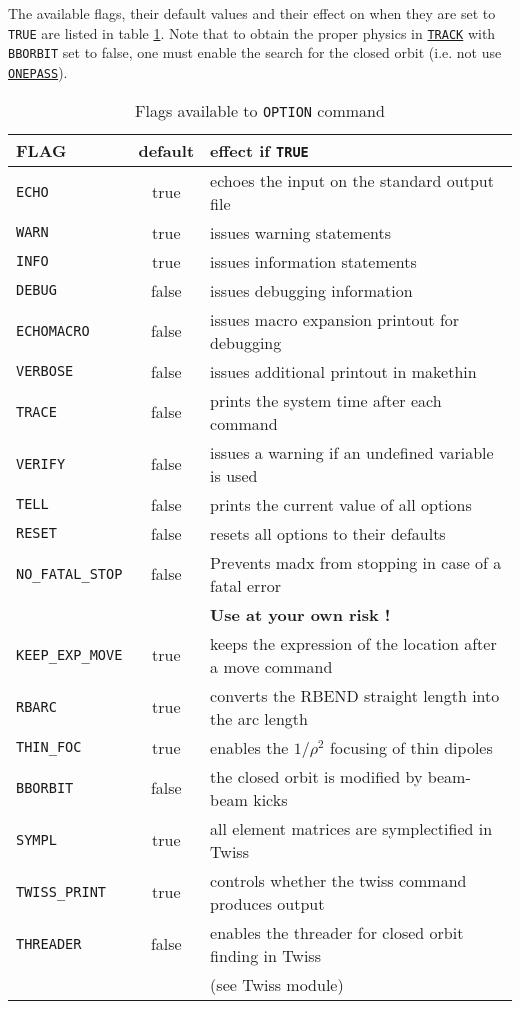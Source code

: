 The available flags, their default values and their effect on \madx when
they are set to \texttt{TRUE} are listed in table \ref{table:options}. Note that to obtain the proper physics in \hyperref[sec:track]{\texttt{TRACK}} with \texttt{BBORBIT} set to false, one must enable the search for the closed orbit (i.e. not use \hyperref[sec:track]{\texttt{ONEPASS}}).

\begin{table}[ht]
  \caption{Flags available to \texttt{OPTION} command}
  \vspace{1ex}
  \centering
  \label{table:options}
  \begin{tabular}{|l|c|l|}
    \hline
    \textbf{FLAG }  & \textbf{default} & \textbf{effect if \texttt{TRUE}} \\
    \hline
    \texttt{ECHO}      & true  & echoes the input on the standard output file \\
    \texttt{WARN}      & true  & issues warning statements\\
    \texttt{INFO}      & true  & issues information statements\\
    \texttt{DEBUG}     & false & issues debugging information \\
    \texttt{ECHOMACRO} & false & issues macro expansion printout for debugging \\
    \texttt{VERBOSE}   & false & issues additional printout in makethin \\
    \texttt{TRACE}     & false & prints the system time after each command \\
    \texttt{VERIFY}    & false & issues a warning if an undefined variable is used 
    \\
    \hline
    \texttt{TELL}      & false & prints the current value of all options \\
    \texttt{RESET}     & false & resets all options to their defaults \\
    \hline
    \texttt{NO\_FATAL\_STOP} & false & Prevents madx from stopping in case of a fatal error \\
    &       & \textbf{Use at your own risk !} \\
    \hline
    \texttt{KEEP\_EXP\_MOVE}& true & keeps the expression of the location after a move command \\
    \hline
    \texttt{RBARC}     & true & converts the RBEND straight length into the arc length \\
    \texttt{THIN\_FOC} & true & enables the $1/\rho^2$ focusing of thin dipoles \\
    \texttt{BBORBIT}   & false & the closed orbit is modified by beam-beam kicks \\
    \texttt{SYMPL}     & true & all element matrices are symplectified in Twiss \\
    \texttt{TWISS\_PRINT} & true & controls whether the twiss command produces output \\
    \texttt{THREADER}  & false & enables the threader for closed orbit finding in Twiss \\ 
    &       & (see Twiss module) \\ 
    \hline
  \end{tabular}
\end{table}

